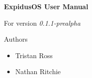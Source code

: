 \begin{titlepage}
	\begin{center}
		\vspace*{5cm}
		\huge\textbf{ExpidusOS User Manual}\normalsize

		\vspace{0.5cm}
		For version \textit{0.1.1-prealpha}

		\vspace{5cm}
		\large
		Authors
		\normalsize
		\begin{itemize}
			\item Tristan Ross
			\item Nathan Ritchie
		\end{itemize}
	\end{center}
\end{titlepage}

